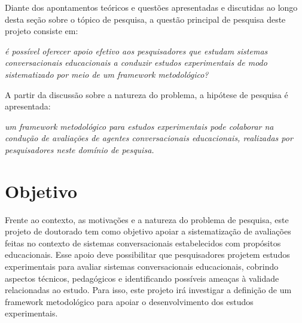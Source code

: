 Diante dos apontamentos teóricos e questões apresentadas e discutidas ao longo desta seção sobre o tópico de pesquisa, a questão principal de pesquisa deste projeto consiste em:

\begin{cframed}
\centering
\footnotesize
{
\noindent \textit{é possível oferecer apoio efetivo aos pesquisadores que estudam sistemas conversacionais educacionais a conduzir estudos experimentais de modo sistematizado por meio de um framework metodológico?
}
}
\end{cframed}


A partir da discussão sobre a natureza do problema, a hipótese de pesquisa é apresentada: 

\begin{cframed}
\centering
\footnotesize
{
\noindent \textit{um framework metodológico para estudos experimentais pode colaborar na condução de avaliações de agentes conversacionais educacionais, realizadas por pesquisadores neste domínio de pesquisa.
}
}
\end{cframed}





\section{Objetivo}

Frente ao contexto, as motivações e a natureza do problema de pesquisa, este projeto de doutorado tem como objetivo apoiar a sistematização de avaliações feitas no contexto de sistemas conversacionais estabelecidos com propósitos educacionais. Esse apoio deve possibilitar que pesquisadores projetem estudos experimentais para avaliar sistemas conversacionais educacionais, cobrindo aspectos técnicos, pedagógicos e identificando possíveis ameaças à validade relacionadas ao estudo. Para isso, este projeto irá investigar a definição de um framework metodológico para apoiar o desenvolvimento dos estudos experimentais. %



